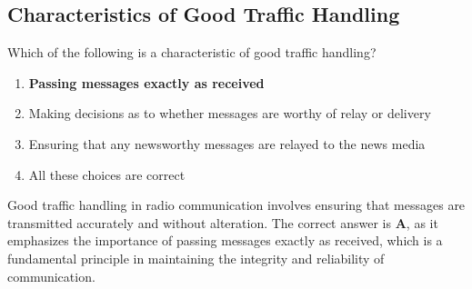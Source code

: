 \subsection{Characteristics of Good Traffic Handling}
\label{T2C08}

\begin{tcolorbox}[colback=gray!10!white,colframe=black!75!black,title=T2C08]
Which of the following is a characteristic of good traffic handling?
\begin{enumerate}[noitemsep]
    \item \textbf{Passing messages exactly as received}
    \item Making decisions as to whether messages are worthy of relay or delivery
    \item Ensuring that any newsworthy messages are relayed to the news media
    \item All these choices are correct
\end{enumerate}
\end{tcolorbox}

Good traffic handling in radio communication involves ensuring that messages are transmitted accurately and without alteration. The correct answer is \textbf{A}, as it emphasizes the importance of passing messages exactly as received, which is a fundamental principle in maintaining the integrity and reliability of communication.